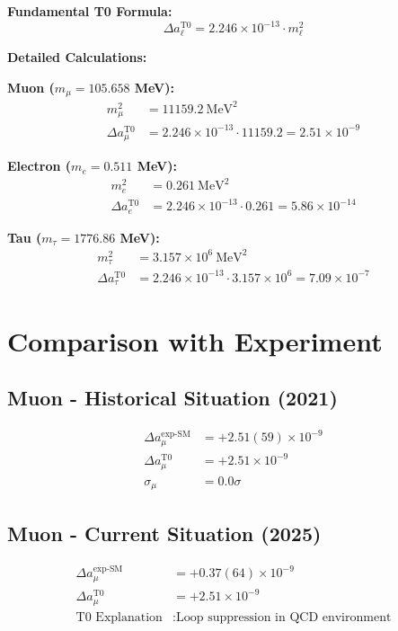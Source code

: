 \documentclass[12pt,a4paper]{article}
\theoremstyle{definition}
\begin{document}
	\begin{formula}
		\textbf{Fundamental T0 Formula:}
		$$\Delta a_\ell^{\text{T0}} = 2.246 \times 10^{-13} \cdot m_\ell^2$$
		
		\textbf{Detailed Calculations:}
		
		\textbf{Muon ($m_\mu = 105.658$ MeV):}
		\begin{align}
			m_\mu^2 &= 11159.2 \ \text{MeV}^2\\
			\Delta a_\mu^{\text{T0}} &= 2.246 \times 10^{-13} \cdot 11159.2 = 2.51 \times 10^{-9}
		\end{align}
		
		\textbf{Electron ($m_e = 0.511$ MeV):}
		\begin{align}
			m_e^2 &= 0.261 \ \text{MeV}^2\\
			\Delta a_e^{\text{T0}} &= 2.246 \times 10^{-13} \cdot 0.261 = 5.86 \times 10^{-14}
		\end{align}
		
		\textbf{Tau ($m_\tau = 1776.86$ MeV):}
		\begin{align}
			m_\tau^2 &= 3.157 \times 10^6 \ \text{MeV}^2\\
			\Delta a_\tau^{\text{T0}} &= 2.246 \times 10^{-13} \cdot 3.157 \times 10^6 = 7.09 \times 10^{-7}
		\end{align}
	\end{formula}
	
	\section{Comparison with Experiment}
	
	\subsection*{Muon - Historical Situation (2021)}
	\begin{align}
		\Delta a_\mu^{\text{exp-SM}} &= +2.51(59) \times 10^{-9}\\
		\Delta a_\mu^{\text{T0}} &= +2.51 \times 10^{-9}\\
		\sigma_\mu &= 0.0\sigma
	\end{align}
	
	\subsection*{Muon - Current Situation (2025)}
	\begin{align}
		\Delta a_\mu^{\text{exp-SM}} &= +0.37(64) \times 10^{-9}\\
		\Delta a_\mu^{\text{T0}} &= +2.51 \times 10^{-9}\\
		\text{T0 Explanation} &: \text{Loop suppression in QCD environment}
	\end{align}
	
\end{document}
